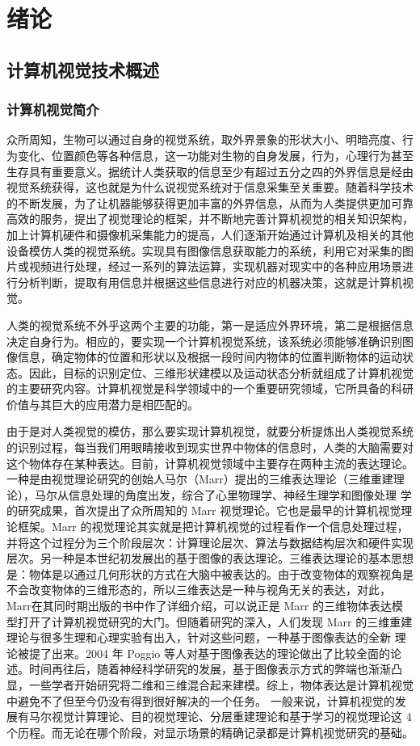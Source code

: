 
\chapter{绪论}
\section{计算机视觉技术概述}
\subsection{计算机视觉简介}
众所周知，生物可以通过自身的视觉系统，取外界景象的形状大小、明暗亮度、行为变化、位置颜色等各种信息，这一功能对生物的自身发展，行为，心理行为甚至生存具有重要意义。据统计人类获取的信息至少有超过五分之四的外界信息是经由视觉系统获得，这也就是为什么说视觉系统对于信息采集至关重要。随着科学技术的不断发展，为了让机器能够获得更加丰富的外界信息，从而为人类提供更加可靠高效的服务，提出了视觉理论的框架，并不断地完善计算机视觉的相关知识架构，加上计算机硬件和摄像机采集能力的提高，人们逐渐开始通过计算机及相关的其他设备模仿人类的视觉系统。实现具有图像信息获取能力的系统，利用它对采集的图片或视频进行处理，经过一系列的算法运算，实现机器对现实中的各种应用场景进行分析判断，提取有用信息并根据这些信息进行对应的机器决策，这就是计算机视觉。

人类的视觉系统不外乎这两个主要的功能，第一是适应外界环境，第二是根据信息决定自身行为。相应的，要实现一个计算机视觉系统，该系统必须能够准确识别图像信息，确定物体的位置和形状以及根据一段时间内物体的位置判断物体的运动状态。因此，目标的识别定位、三维形状建模以及运动状态分析就组成了计算机视觉的主要研究内容。计算机视觉是科学领域中的一个重要研究领域，它所具备的科研价值与其巨大的应用潜力是相匹配的。

由于是对人类视觉的模仿，那么要实现计算机视觉，就要分析提炼出人类视觉系统的识别过程，每当我们用眼睛接收到现实世界中物体的信息时，人类的大脑需要对这个物体存在某种表达。目前，计算机视觉领域中主要存在两种主流的表达理论。一种是由视觉理论研究的创始人马尔（Marr）提出的三维表达理论（三维重建理论），马尔从信息处理的角度出发，综合了心里物理学、神经生理学和图像处理
学的研究成果，首次提出了众所周知的 Marr 视觉理论。它也是最早的计算机视觉理论框架。Marr 的视觉理论其实就是把计算机视觉的过程看作一个信息处理过程，并将这个过程分为三个阶段层次：计算理论层次、算法与数据结构层次和硬件实现层次。另一种是本世纪初发展出的基于图像的表达理论。三维表达理论的基本思想是：物体是以通过几何形状的方式在大脑中被表达的。由于改变物体的观察视角是不会改变物体的三维形态的，所以三维表达是一种与视角无关的表达，对此，Marr在其同时期出版的书中作了详细介绍，可以说正是 Marr 的三维物体表达模型打开了计算机视觉研究的大门。但随着研究的深入，人们发现 Marr  的三维重建理论与很多生理和心理实验有出入，针对这些问题，一种基于图像表达的全新
理论被提了出来。2004 年 Poggio  等人对基于图像表达的理论做出了比较全面的论述。时间再往后，随着神经科学研究的发展，基于图像表示方式的弊端也渐渐凸显，一些学者开始研究将二维和三维混合起来建模。综上，物体表达是计算机视觉中避免不了但至今仍没有得到很好解决的一个任务。 一般来说，计算机视觉的发展有马尔视觉计算理论、目的视觉理论、分层重建理论和基于学习的视觉理论这 4 个历程。而无论在哪个阶段，对显示场景的精确记录都是计算机视觉研究的基础。

